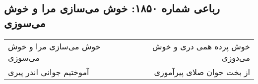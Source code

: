 \begin{center}
\section*{رباعی شماره ۱۸۵۰: خوش می‌سازی مرا و خوش می‌سوزی}
\label{sec:1850}
\begin{longtable}{l p{0.5cm} r}
خوش می‌سازی مرا و خوش می‌سوزی
&&
خوش پرده همی دری و خوش می‌دوزی
\\
آموختیم جوانی اندر پیری
&&
از بخت جوان صلای پیرآموزی
\\
\end{longtable}
\end{center}
